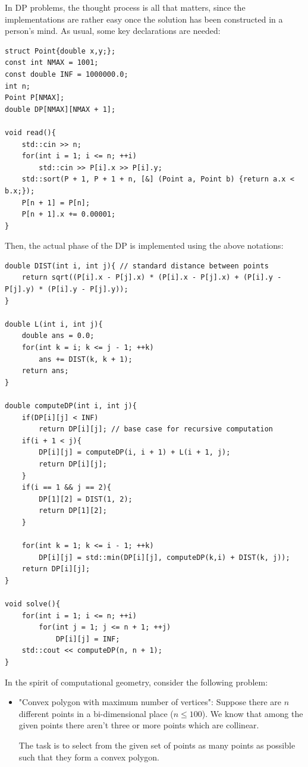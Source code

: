 \documentclass[letterpaper]{article}
\begin{document}
\newpage


In DP problems, the thought process is all that matters, since the implementations are rather easy once the solution has been constructed in a person's mind. As usual, some key declarations are needed:

\begin{lstlisting}
struct Point{double x,y;};
const int NMAX = 1001;
const double INF = 1000000.0;
int n;
Point P[NMAX];
double DP[NMAX][NMAX + 1];

void read(){
    std::cin >> n;
    for(int i = 1; i <= n; ++i)
        std::cin >> P[i].x >> P[i].y;
    std::sort(P + 1, P + 1 + n, [&] (Point a, Point b) {return a.x < b.x;});
    P[n + 1] = P[n];
    P[n + 1].x += 0.00001;
}
\end{lstlisting}

Then, the actual phase of the DP is implemented using the above notations:

\begin{lstlisting}
double DIST(int i, int j){ // standard distance between points
    return sqrt((P[i].x - P[j].x) * (P[i].x - P[j].x) + (P[i].y - P[j].y) * (P[i].y - P[j].y));
}

double L(int i, int j){
    double ans = 0.0;
    for(int k = i; k <= j - 1; ++k)
        ans += DIST(k, k + 1);
    return ans;
}

double computeDP(int i, int j){
    if(DP[i][j] < INF)
        return DP[i][j]; // base case for recursive computation
    if(i + 1 < j){
        DP[i][j] = computeDP(i, i + 1) + L(i + 1, j);
        return DP[i][j];
    }
    if(i == 1 && j == 2){
        DP[1][2] = DIST(1, 2);
        return DP[1][2];
    }

    for(int k = 1; k <= i - 1; ++k)
        DP[i][j] = std::min(DP[i][j], computeDP(k,i) + DIST(k, j));
    return DP[i][j];
}

void solve(){
    for(int i = 1; i <= n; ++i)
        for(int j = 1; j <= n + 1; ++j)
            DP[i][j] = INF;
    std::cout << computeDP(n, n + 1);
}
\end{lstlisting}

In the spirit of computational geometry, consider the following problem:

\begin{itemize}
    \item "Convex polygon with maximum number of vertices": Suppose there are $n$ different points in a bi-dimensional place ($n \leq 100$). We know that among the given points there aren't three or more points which are collinear. 
    
    The task is to select from the given set of points as many points as possible such that they form a convex polygon.
\end{itemize}
\end{document}
